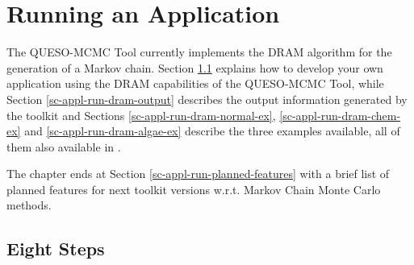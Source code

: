 \chapter{Running an Application}\label{ch-appl-run}
\thispagestyle{headings}

The QUESO-MCMC Tool currently implements the DRAM algorithm \cite{HaLaMiSa06} for the generation of a Markov chain.
Section \ref{sc-appl-run-eight-steps} explains how to develop your own application using the DRAM capabilities of the QUESO-MCMC Tool, while
Section \ref{sc-appl-run-dram-output} describes the output information generated by the toolkit and
Sections
\ref{sc-appl-run-dram-normal-ex},
\ref{sc-appl-run-dram-chem-ex} and
\ref{sc-appl-run-dram-algae-ex}
describe the three examples available,
all of them also available in \cite{mcmctool}.

The chapter ends at Section \ref{sc-appl-run-planned-features} with a brief list of planned features for next toolkit versions w.r.t. Markov Chain Monte Carlo methods.

\section{Eight Steps}\label{sc-appl-run-eight-steps}

